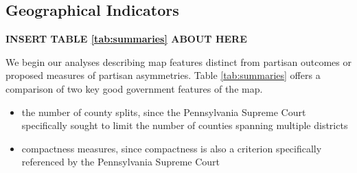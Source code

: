         \subsection*{Geographical Indicators}
	
		\begin{center}\textbf{INSERT TABLE \ref{tab:summaries} ABOUT HERE} \end{center}
\par
    We begin our analyses describing map features distinct from partisan outcomes or proposed measures of partisan asymmetries. Table \ref{tab:summaries} offers a comparison of two key good government features of the map.
%
	\begin{itemize}
	    \item the number of county splits, since the Pennsylvania Supreme Court specifically sought to limit the number of counties spanning multiple districts
	    \item compactness measures, since compactness is also a criterion specifically referenced by the Pennsylvania Supreme Court
	\end{itemize}
%
\par
